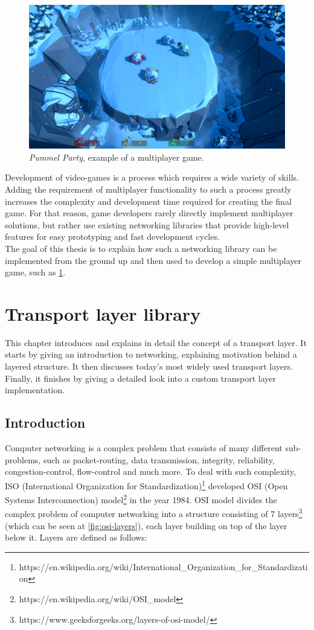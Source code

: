 \documentclass[times, utf8, diplomski]{fer}
\begin{document}
\begin{figure}[H]
	\centering
	\includegraphics[scale=0.66]{Pummel-Party}
	\caption{\textit{Pummel Party}, example of a multiplayer game.}
	\label{fig:pummel}
\end{figure}
 
Development of video-games is a process which requires a wide variety of skills. Adding the requirement of multiplayer functionality to such a process greatly increases the complexity and development time required for creating the final game. For that reason, game developers rarely directly implement multiplayer solutions, but rather use existing networking libraries that provide high-level features for easy prototyping and fast development cycles.\\

The goal of this thesis is to explain how such a networking library can be implemented from the ground up and then used to develop a simple multiplayer game, such as \ref{fig:pummel}. \\

\chapter{Transport layer library}
This chapter introduces and explains in detail the concept of a transport layer. It starts by giving an introduction to networking, explaining motivation behind a layered structure. It then discusses today's most widely used transport layers. Finally, it finishes by giving a detailed look into a custom transport layer implementation.

\section{Introduction}
Computer networking is a complex problem that consists of many different sub-problems, such as packet-routing, data transmission, integrity, reliability, congestion-control, flow-control and much more. To deal with such complexity, ISO (International Organization for Standardization)\footnote{https://en.wikipedia.org/wiki/International\_Organization\_for\_Standardization} developed OSI (Open Systems Interconnection) model\footnote{https://en.wikipedia.org/wiki/OSI\_model} in the year 1984. OSI model divides the complex problem of computer networking into a structure consisting of 7 layers\footnote{https://www.geeksforgeeks.org/layers-of-osi-model/} (which can be seen at \ref{fig:osi-layers}), each layer building on top of the layer below it. Layers are defined as follows:
\end{document}
